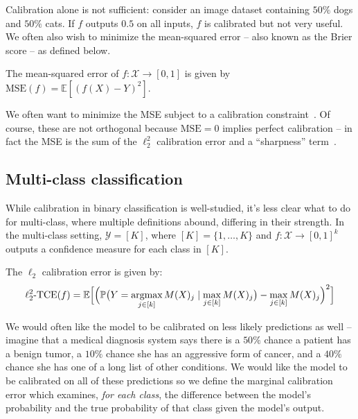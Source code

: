 Calibration alone is not sufficient: consider an image dataset containing $50\%$ dogs and $50\%$ cats.
If $f$ outputs $0.5$ on all inputs, $f$ is calibrated but not very useful.
We often also wish to minimize the mean-squared error -- also known as the Brier score -- as defined below.

\begin{definition}
The mean-squared error of $f : \mathcal{X} \to [0, 1]$ is given by $\mbox{MSE}(f) = \mathbb{E}[(f(X) - Y)^2]$.
\end{definition}

We often want to minimize the MSE subject to a calibration constraint~\cite{gneiting2005weather, gneiting2007probabilistic}. Of course, these are not orthogonal because $\mbox{MSE} = 0$ implies perfect calibration -- in fact the MSE is the sum of the $\ell_2^2$ calibration error and a ``sharpness'' term~\cite{murphy1973vector,degroot1983forecasters, kuleshov2015calibrated}.

\subsection{Multi-class classification}

While calibration in binary classification is well-studied,
it's less clear what to do for multi-class, where multiple definitions abound, differing in their strength. In the multi-class setting, $\mathcal{Y} = [K]$, where $[K] = \{1, \dots, K\}$ and $f : \mathcal{X} \to [0, 1]^k$ outputs a confidence measure for each class in $[K]$.

\begin{definition}
The $\ell_2$ calibration error is given by:
\begin{align}
\ell_2^2\mbox{-TCE}(f) = \mathbb{E}\Big[ \Big( \mathbb{P}\big(Y = \mathop{\mbox{argmax}}_{j \in [k]} M(X)_j \mid \max_{j \in [k]} M(X)_j\big) - \max_{j \in [k]} M(X)_j \Big)^2 \Big]
\end{align}
\end{definition}

We would often like the model to be calibrated on less likely predictions as well -- imagine that a medical diagnosis system says there is a $50\%$ chance a patient has a benign tumor, a $10\%$ chance she has an aggressive form of cancer, and a $40\%$ chance she has one of a long list of other conditions. We would like the model to be calibrated on all of these predictions so we define the marginal calibration error which examines, \emph{for each class}, the difference between the model's probability and the true probability of that class given the model's output.

